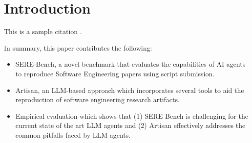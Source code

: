 \section{Introduction}
\label{s:introduction}

This is a sample citation \cite{wasm-r3}.

In summary, this paper contributes the following:
\begin{itemize}
    \item SERE-Bench, a novel benchmark that evaluates the capabilities of AI agents to reproduce Software Engineering papers using script submission.
    \item Artisan, an LLM-based approach which incorporates several tools to aid the reproduction of software engineering research artifacts.
    \item Empirical evaluation which shows that (1) SERE-Bench is challenging for the current state of the art LLM agents and (2) Artisan effectively addresses the common pitfalls faced by LLM agents.
\end{itemize}
